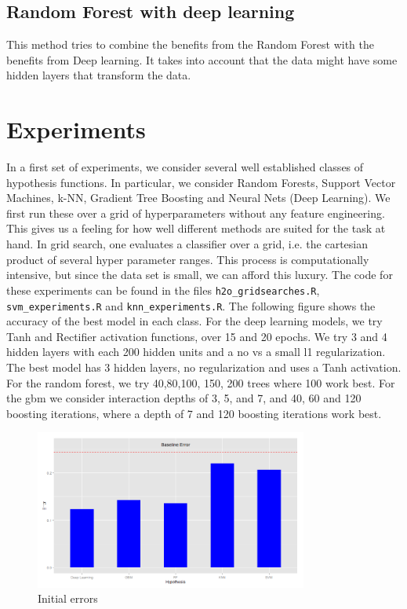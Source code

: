 \documentclass[paper=a4, fontsize=11pt]{scrartcl}
\numberwithin{equation}{section}
\numberwithin{figure}{section}
\numberwithin{table}{section}
\begin{document}
\subsection{Random Forest with deep learning}
This  method tries to combine the benefits from the Random Forest with the benefits from Deep learning. It takes into account that the data might have some hidden layers that transform the data. 









\section{Experiments}
In a first set of experiments, we consider several well established classes of hypothesis functions. In particular, we consider Random Forests, Support Vector Machines, k-NN,  Gradient Tree Boosting and Neural Nets (Deep Learning). 
We first run these over a grid of hyperparameters without any feature engineering. This gives us a feeling for how well different methods are suited for the task at hand. In grid search, one evaluates a classifier over a grid, i.e. the cartesian product of several hyper parameter ranges. This process is computationally intensive, but since the data set is small, we can afford this luxury. The code for these experiments can be found in the files \lstinline{h2o_gridsearches.R}, \lstinline{svm_experiments.R} and \lstinline{knn_experiments.R}. The following figure shows the accuracy of the best model in each class. For the deep learning models, we try Tanh and Rectifier activation functions, over 15 and 20 epochs. We try 3 and 4 hidden layers with each 200 hidden units and a no vs a small l1 regularization. The best model has 3 hidden layers, no regularization and uses a Tanh activation. For the random forest, we try 40,80,100, 150, 200 trees where 100 work best. For the gbm we consider interaction depths of 3, 5, and 7, and 40, 60 and 120 boosting iterations, where a depth of 7 and 120 boosting iterations work best. 



\begin{figure}[H]
    \centering
    \includegraphics[width=0.8\textwidth]{erorrs.png}
    \caption{Initial errors}
    \label{fig:errors}
\end{figure}
\end{document}
